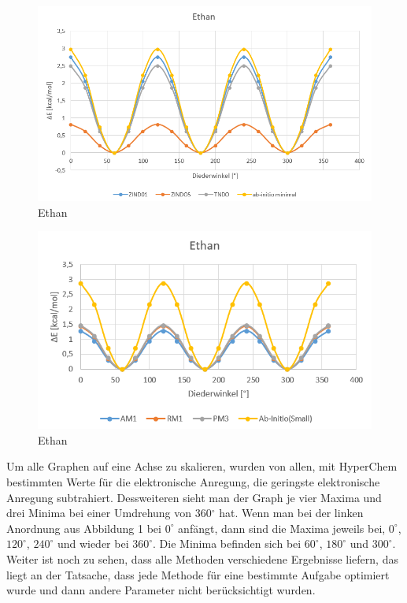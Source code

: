 \begin{figure}[H]
    \centering
    \includegraphics[scale=.7]{../src/img/ethan1.png}
    \caption{Ethan}
\end{figure}

\begin{figure}[H]
    \centering
    \includegraphics[scale=.9]{../src/img/ethan2.png}
    \caption{Ethan}
\end{figure}

Um alle Graphen auf eine Achse zu skalieren, wurden von allen, mit HyperChem bestimmten Werte für die elektronische Anregung, die geringste
elektronische Anregung subtrahiert. Dessweiteren sieht man der Graph je vier Maxima und drei Minima bei einer Umdrehung von 360$^\circ$ hat.
Wenn man bei der linken Anordnung aus Abbildung 1 bei $0^\circ$ anfängt, dann sind die Maxima jeweils bei, $0^\circ$, $120^\circ$, $240^\circ$
und wieder bei $360^\circ$. Die Minima befinden sich bei $60^\circ$, $180^\circ$ und $300^\circ$.\\
Weiter ist noch zu sehen, dass alle Methoden verschiedene Ergebnisse liefern, das liegt an der Tatsache, dass jede Methode für eine bestimmte
Aufgabe optimiert wurde und dann andere Parameter nicht berücksichtigt wurden.

